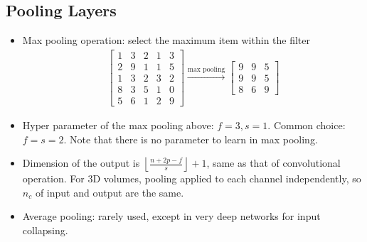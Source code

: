 \subsection{Pooling Layers}
\begin{itemize}
  \item Max pooling operation: select the maximum item within the filter
  \begin{align*}
    \begin{bmatrix}
      1 & 3 & 2 & 1 & 3\\ 
      2 & 9 & 1 & 1 & 5\\
      1 & 3 & 2 & 3 & 2\\
      8 & 3 & 5 & 1 & 0\\
      5 & 6 & 1 & 2 & 9
    \end{bmatrix}\xrightarrow{\text{max pooling}}
    \begin{bmatrix}
      9 & 9 & 5\\
      9 & 9 & 5\\
      8 & 6 & 9
    \end{bmatrix}
  \end{align*}
  \item Hyper parameter of the max pooling above: $f=3, s=1$. Common choice: $f=s=2$. Note that there is no parameter to learn in max pooling. 
  \item Dimension of the output is $\left\lfloor\frac{n+2p-f}{s}\right\rfloor+1$, same as that of convolutional operation. For 3D volumes, pooling applied to each channel independently, so $n_c$ of input and output are the same.
  \item Average pooling: rarely used, except in very deep networks for input collapsing.
\end{itemize}

